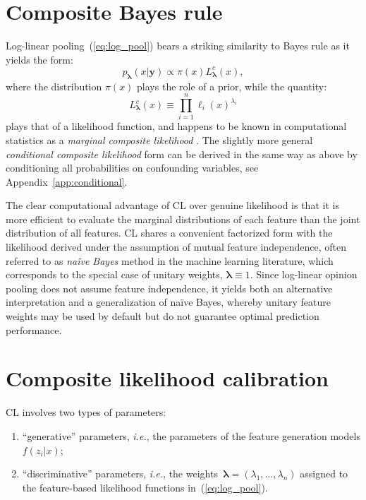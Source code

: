 \documentclass[english]{scrartcl}
\def\y{{\mathbf{y}}}
\newcommand{\blambda}{{\boldsymbol{\lambda}}}
\begin{document}
\section{Composite Bayes rule}
\label{sec:bayes_rule}

Log-linear pooling~(\ref{eq:log_pool}) bears a striking similarity to Bayes rule as it yields the form: 
$$
p_\blambda(x|\y)\propto \pi(x) L^c_\blambda(x),
$$
where the distribution $\pi(x)$ plays the role of a prior, while the quantity:
\begin{equation}
\label{eq:comp_lik}
L^c_\blambda(x) \equiv \prod_{i=1}^n \ell_i (x)^{\lambda_i}
\end{equation} 
plays that of a likelihood function, and happens to be known in computational statistics as a {\em marginal composite likelihood} \cite{Varin-11}. The slightly more general {\em conditional composite likelihood} form can be derived in the same way as above by conditioning all probabilities on confounding variables, see Appendix~\ref{app:conditional}. 

The clear computational advantage of CL over genuine likelihood is that it is more efficient to evaluate the marginal distributions of each feature than the joint distribution of all features. CL shares a convenient factorized form with the likelihood derived under the assumption of mutual feature independence, often referred to as {\em na\"ive Bayes} method in the machine learning literature, which corresponds to the special case of unitary weights, $\blambda\equiv 1$. Since log-linear opinion pooling does not assume feature independence, it yields both an alternative interpretation and a generalization of na\"ive Bayes, whereby unitary feature weights may be used by default but do not guarantee optimal prediction performance.


\section{Composite likelihood calibration}
\label{sec:calibration}

CL involves two types of parameters:
\begin{enumerate}
    \item ``generative'' parameters, {\em i.e.}, the parameters of the feature generation models $f(z_i|x)$; 
    \item ``discriminative'' parameters, {\em i.e.},  the weights~$\blambda=(\lambda_1,\ldots,\lambda_n)$ assigned to the feature-based likelihood functions in~(\ref{eq:log_pool}).
\end{enumerate}
\end{document}
